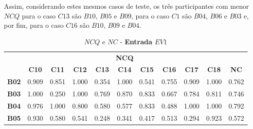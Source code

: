 Assim, considerando estes mesmos casos de teste, os três participantes com menor $NCQ$ para o caso $C13$ são $B10$, $B05$ e $B09$, para o caso $C1$ são $B04$, $B06$ e $B03$ e, por fim, para o caso $C16$ são $B10$, $B09$ e $B04$.


\begin{table}[htbp]
	\centering
	\caption{$NCQ$ e $NC$ - \textbf{Entrada $EV1$}}
	\begin{tabular}{|c|ccccccccc|c|}
		\hline
		\rowcolor[HTML]{D0CECE} 
		\cellcolor[HTML]{D0CECE} & \multicolumn{9}{c|}{\cellcolor[HTML]{D0CECE}\textbf{NCQ}} & \cellcolor[HTML]{D0CECE} \\ \cline{2-10}
		\rowcolor[HTML]{D0CECE} 
		\multirow{-2}{*}{\cellcolor[HTML]{D0CECE}\textbf{Part.}} & \multicolumn{1}{c|}{\cellcolor[HTML]{D0CECE}\textbf{C10}} & \multicolumn{1}{c|}{\cellcolor[HTML]{D0CECE}\textbf{C11}} & \multicolumn{1}{c|}{\cellcolor[HTML]{D0CECE}\textbf{C12}} & \multicolumn{1}{c|}{\cellcolor[HTML]{D0CECE}\textbf{C13}} & \multicolumn{1}{c|}{\cellcolor[HTML]{D0CECE}\textbf{C14}} & \multicolumn{1}{c|}{\cellcolor[HTML]{D0CECE}\textbf{C15}} & \multicolumn{1}{c|}{\cellcolor[HTML]{D0CECE}\textbf{C16}} & \multicolumn{1}{c|}{\cellcolor[HTML]{D0CECE}\textbf{C17}} & \textbf{C18} & \multirow{-2}{*}{\cellcolor[HTML]{D0CECE}\textbf{NC}} \\ \hline
		\textbf{B02} & \multicolumn{1}{c|}{0.909} & \multicolumn{1}{c|}{0.851} & \multicolumn{1}{c|}{1.000} & \multicolumn{1}{c|}{0.354} & \multicolumn{1}{c|}{1.000} & \multicolumn{1}{c|}{0.541} & \multicolumn{1}{c|}{0.755} & \multicolumn{1}{c|}{0.909} & 1.000 & 0.762 \\ \hline
		\rowcolor[HTML]{F2F2F2} 
		\textbf{B03} & \multicolumn{1}{c|}{\cellcolor[HTML]{F2F2F2}1.000} & \multicolumn{1}{c|}{\cellcolor[HTML]{F2F2F2}0.250} & \multicolumn{1}{c|}{\cellcolor[HTML]{F2F2F2}1.000} & \multicolumn{1}{c|}{\cellcolor[HTML]{F2F2F2}0.769} & \multicolumn{1}{c|}{\cellcolor[HTML]{F2F2F2}0.870} & \multicolumn{1}{c|}{\cellcolor[HTML]{F2F2F2}0.833} & \multicolumn{1}{c|}{\cellcolor[HTML]{F2F2F2}0.667} & \multicolumn{1}{c|}{\cellcolor[HTML]{F2F2F2}0.784} & 0.811 & 0.746 \\ \hline
		\textbf{B04} & \multicolumn{1}{c|}{0.976} & \multicolumn{1}{c|}{1.000} & \multicolumn{1}{c|}{0.800} & \multicolumn{1}{c|}{0.580} & \multicolumn{1}{c|}{0.577} & \multicolumn{1}{c|}{0.833} & \multicolumn{1}{c|}{0.488} & \multicolumn{1}{c|}{1.000} & 1.000 & 0.792 \\ \hline
		\rowcolor[HTML]{F2F2F2} 
		\textbf{B05} & \multicolumn{1}{c|}{\cellcolor[HTML]{F2F2F2}0.930} & \multicolumn{1}{c|}{\cellcolor[HTML]{F2F2F2}0.580} & \multicolumn{1}{c|}{\cellcolor[HTML]{F2F2F2}0.541} & \multicolumn{1}{c|}{\cellcolor[HTML]{F2F2F2}0.248} & \multicolumn{1}{c|}{\cellcolor[HTML]{F2F2F2}0.341} & \multicolumn{1}{c|}{\cellcolor[HTML]{F2F2F2}0.417} & \multicolumn{1}{c|}{\cellcolor[HTML]{F2F2F2}0.513} & \multicolumn{1}{c|}{\cellcolor[HTML]{F2F2F2}0.294} & 0.923 & 0.572 \\ \hline

\end{tabular}
\end{table}
